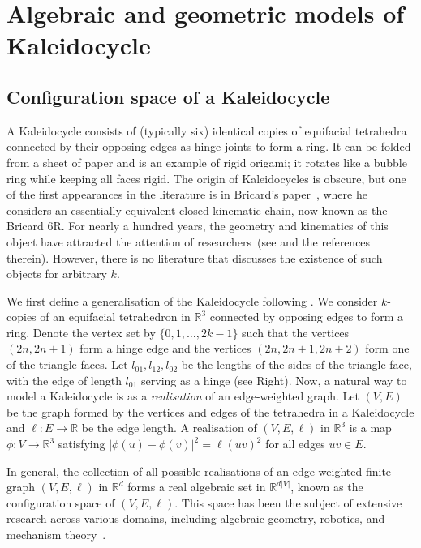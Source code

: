 \documentclass[10pt,leqno]{amsart}
\newcommand{\R}{\mathbb{R}}
\numberwithin{equation}{section}
\begin{document}
\section{Algebraic and geometric models of Kaleidocycle}\label{sec:def}

\subsection{Configuration space of a Kaleidocycle}
\label{sec:kaleidocycle}
A Kaleidocycle consists of (typically six) 
identical copies of equifacial tetrahedra 
connected by their opposing edges as hinge joints to form a ring.
It can be folded from a sheet of paper and 
is an example of rigid origami; it rotates like a bubble ring while keeping all faces rigid.
The origin of Kaleidocycles is obscure, but
one of the first appearances in the literature is in Bricard's paper~\cite{bricard},
where he considers an essentially equivalent closed kinematic chain,
now known as the Bricard 6R.
For nearly a hundred years, the geometry and kinematics of this object have attracted the attention of researchers~(see \cite{safsten2016analyzing} and the references therein).
However, there is no literature that discusses the existence of such objects for arbitrary $k$.

We first define a generalisation of the Kaleidocycle following \cite{seimitsu}.
We consider $k$-copies of an equifacial tetrahedron in $\R^3$ connected by opposing edges to form a ring.
Denote the vertex set by $\{0,1,\ldots,2k-1\}$ such that the vertices $(2n,2n+1)$
form a hinge edge and the vertices $(2n,2n+1,2n+2)$ form one of the triangle faces.
Let $l_{01},l_{12},l_{02}$ be the lengths of the sides of the triangle face, with the edge of length $l_{01}$ serving as a hinge (see  Right).
Now, a natural way to model a Kaleidocycle is as a \emph{realisation} of an edge-weighted graph.
Let $(V,E)$ be the graph formed by the vertices and edges of the tetrahedra in a Kaleidocycle 
and $\ell:E\to \R$ be the edge length.
A realisation of $(V,E,\ell)$ in $\R^3$
is a map $\phi: V\to \R^3$ satisfying
$|\phi(u)-\phi(v)|^2=\ell(uv)^2$ for all edges $uv\in E$.

In general, the collection of all possible realisations of an edge-weighted finite graph 
$(V,E,\ell)$ in $\R^d$
 forms a real algebraic set in $\mathbb{R}^{d|V|}$, known as the configuration space of $(V,E,\ell)$. 
This space has been the subject of extensive research across various domains, including algebraic geometry, robotics, and mechanism theory~\cite{Hausmann-Knutson,Kapovich-Millson,MR3246296}. 
\end{document}
